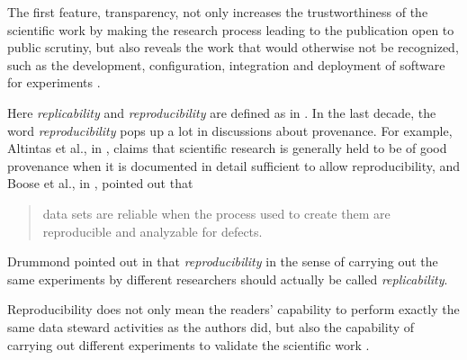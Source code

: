The first feature, transparency, not only increases the trustworthiness of the scientific work by making the research process leading to the publication open to public scrutiny, but also reveals the work that would otherwise not be recognized, such as the development, configuration, integration and deployment of software for experiments \cite{goble2014better}.

Here \emph{replicability} and \emph{reproducibility} are defined as in \cite{drummond2009replicability}. In the last decade, the word \emph{reproducibility} pops up a lot in discussions about provenance. For example, Altintas et al., in \cite{altintas2004kepler}, claims that scientific research is generally held to be of good provenance when it is documented in detail sufficient to allow reproducibility, and Boose et al., in \cite{boose2007ensuring}, pointed out that \begin{quote}data sets are reliable when the process used to create them are reproducible and analyzable for defects.\end{quote}  Drummond pointed out in \cite{drummond2009replicability} that \emph{reproducibility} in the sense of carrying out the same experiments by different researchers should actually be called \emph{replicability}. 


Reproducibility does not only mean the readers' capability to perform exactly the same data steward activities as the authors did, but also the capability of carrying out different experiments to validate the scientific work \cite{drummond2009replicability}. 
\cite{goble2014better}



